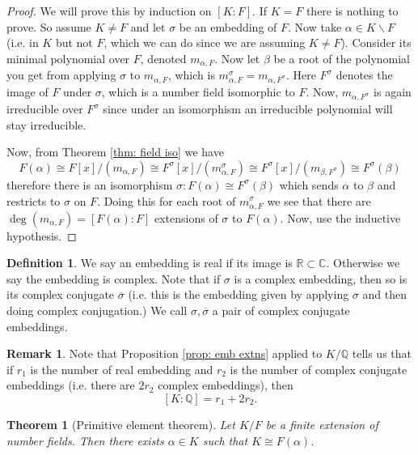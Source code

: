 \documentclass[11pt,a4paper]{report}
\theoremstyle{plain}
\newtheorem{theorem}[subsection]{Theorem}
\theoremstyle{definition}
\newtheorem{definition}[subsection]{Definition}
\theoremstyle{definition}
\newtheorem{rmrk}[subsection]{Remark}
\newcommand{\RR}{\mathbb{R}}
\def\CC{\mathbb{C}}
\def\QQ{\mathbb{Q}}
\def \a{\alpha}
\def \s {\sigma}
\def \s {\sigma}
\def \ov{\overline}
\begin{document}
	\begin{proof}
		We will prove this by induction on $[K:F]$. If $K=F$ there is nothing to prove. So assume $K \neq F$ and let $\s$ be an embedding of $F$. Now take $\a \in K \backslash F$ (i.e. in $K$ but not $F$, which we can do since we are assuming $K \neq F$). Consider its minimal polynomial over $F$, denoted $m_{\a,F}$. Now let $\beta$ be a root of the polynomial you get from applying $\s$ to $m_{\a,F}$, which is $m_{\a,F}^\s=m_{\a,F^\s}$. Here $F^\s$ denotes the image of $F$ under $\s$, which is a number field isomorphic to $F$. Now, $m_{\a,F^\s}$ is again irreducible over $F^\s$ since under an isomorphism an irreducible polynomial will stay irreducible.
		
		Now, from Theorem \ref{thm: field iso} we have \[F(\a) \cong F[x]/(m_{\a,F}) \cong F^\s[x]/(m_{\a,F}^\s) \cong F^\s[x]/(m_{\beta,F^\s}) \cong F^\s(\beta)\] therefore there is an isomorphism $\sigma:F(\a) \cong F^\s(\beta)$ which sends $\a$ to $\beta$ and restricts to $\s$ on $F$. Doing this for each root of $m_{\a,F}^\s$ we see that there are $\deg(m_{\a,F})=[F(\a):F]$  extensions of $\s$ to $F(\a)$. Now, use the inductive hypothesis. 
	\end{proof}
	
	\begin{definition}
		We say an embedding is real if its image is $\RR \subset \CC$. Otherwise we say the embedding is complex. Note that if $\s$ is a complex embedding, then so is its complex conjugate $\ov{\s}$ (i.e. this is the embedding given by applying $\s$ and then doing complex conjugation.) We call $\s,\ov{\s}$ a pair of complex conjugate embeddings. 
	\end{definition}
	
	
	\begin{rmrk}
		Note that Proposition \ref{prop: emb extns} applied to $K/\QQ$ tells us that if $r_1$ is the number of real embedding and $r_2$ is the number of complex conjugate embeddings (i.e. there are $2r_2$ complex embeddings), then \[[K:\QQ]=r_1+2r_2.\] 
	\end{rmrk}
	
	
	
	\begin{theorem}[Primitive element theorem]\label{thm: prim elt theorem}
		Let $K/F$ be a finite extension of number fields. Then there exists $\a \in K$ such that $K \cong F(\a)$.
		
	\end{theorem}
	
\end{document}
